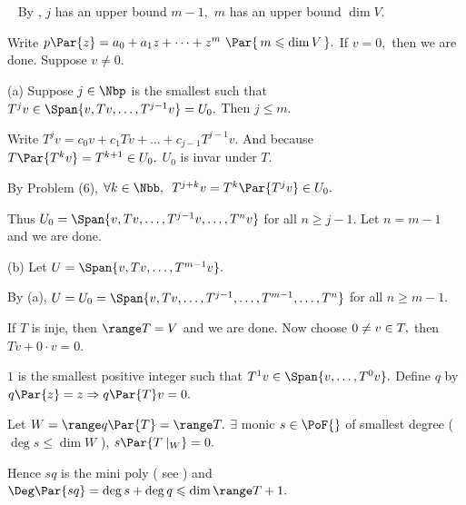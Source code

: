 \par\quad
\Comment\,\,\, By \NOTEFOR [8.40], $j$ has an upper bound $m-1,$ $m$ has an upper bound $\dim V.$\par\quad
Write $p\Par{z}=a_0 +a_1 z+\dots+z^m \,\,\Par{\,m\leqslant \dim V\,}.$ If $v=0,$ then we are done. Suppose $v\neq 0.$\par\quad
(a) Suppose $j\in\Nbp$ is the smallest such that $T^j v\in\Span{v,Tv,\dots,T^{j-1}v}=U_0.$ Then $j\leqslant m.$\par\quad\Ha
Write $T^j v=c_0 v+c_1 Tv+\dots+c_{j-1}T^{j-1}v.$ And because $T\Par{T^k v}=T^{k+1}\in U_0.$ $U_0$ is invar under $T.$\par\quad\Ha
By Problem (6), $\forall k\in\Nbb,\,\,\,T^{j+k}v=T^k\Par{T^j v}\in U_0.$\par\quad\Ha
Thus $U_0=\Span{v,Tv,\dots,T^{j-1} v,\dots,T^n v}$ for all $n\geqslant j-1.$ Let $n=m-1$ and we are done.\par\quad
(b) Let $U=\Span{v,Tv,\dots,T^{m-1}v}.$\par\quad\Hb
By (a), $U=U_0=\Span{v,Tv,\dots,T^{j-1},\dots,T^{m-1},\dots,T^n}$ for all $n\geqslant m-1.$\PfEnd
\SepLine

\par\quad
If $T$ is inje, then $\range T=V$ and we are done. Now choose $0\neq v\in\null T,$ then $Tv+0\cdot v=0.$\par\quad
$1$ is the smallest positive integer such that $T^1 v\in\Span{v,\dots,T^0 v}.$ Define $q$ by $q\Par{z}=z\Rightarrow q\Par{T}v=0.$\par\quad
Let $W=\range q\Par{T}=\range T.$ $\exists$ monic $s\in\PoF{}$ of smallest degree ( $\deg s\leqslant\dim W$ ), $s\Par{T\mid_W}=0.$\par\quad
Hence $sq$ is the mini poly ( see \NOTEFOR [8.40] ) and $\Deg\Par{sq}=\deg s+\deg q\leqslant\dim\range T+1.$\PfEnd
\SepLine

